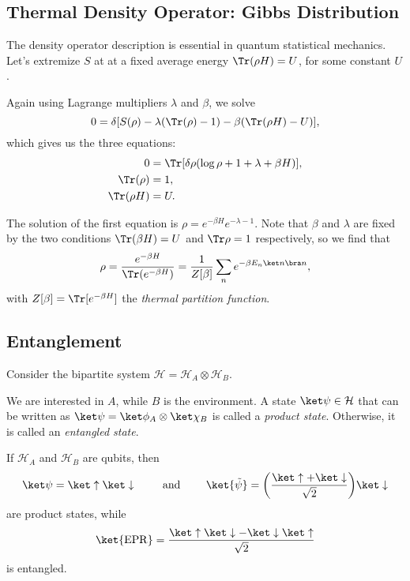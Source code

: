 \documentclass[12pt]{article}
\begin{document}
\subsection{Thermal Density Operator: Gibbs Distribution}
\label{sub:gibbs_dist}

The density operator description is essential in quantum statistical mechanics. Let's extremize $S$ at at a fixed average energy $\Tr(\rho H) = U$, for some constant $U$.

Again using Lagrange multipliers $\lambda$ and $\beta$, we solve
\[
	0 = \delta[S(\rho) - \lambda(\Tr(\rho) - 1) - \beta(\Tr(\rho H) - U)],
\]
which gives us the three equations:
\begin{align*}
	0 &= \Tr[ \delta \rho(\log \rho + 1 + \lambda + \beta H)], \\
	\Tr(\rho) &= 1,\\
	\Tr(\rho H) &= U.
\end{align*}


The solution of the first equation is $\rho = e^{-\beta H} e^{-\lambda - 1}$. Note that $\beta$ and $\lambda$ are fixed by the two conditions $\Tr(\beta H) = U$ and $\Tr \rho = 1$ respectively, so we find that
\[
	\rho = \frac{e^{-\beta H}}{\Tr(e^{-\beta H})} = \frac{1}{Z[\beta]} \sum_n e^{-\beta E_n \ket n \bra n},
\]
with $Z[\beta] = \Tr[e^{-\beta H}]$ the \emph{thermal partition function}.

\subsection{Entanglement}
\label{sub:entanglement}

Consider the bipartite system $\mathcal{H} = \mathcal{H}_A \otimes \mathcal{H}_B$.

We are interested in $A$, while $B$ is the environment. A state $\ket \psi \in \mathcal{H}$ that can be written as $\ket \psi = \ket \phi_A \otimes \ket \chi_B$ is called a \emph{product state}. Otherwise, it is called an \emph{entangled state}.

\begin{exbox}
	If $\mathcal{H}_A$ and $\mathcal{H}_B$ are qubits, then
	\[
		\ket \psi = \ket \uparrow \ket \downarrow \qquad \text{ and } \qquad \ket{\tilde \psi} = \biggl( \frac{\ket \uparrow + \ket \downarrow}{\sqrt 2} \biggr) \ket \downarrow
	\]
	are product states, while
	\[
		\ket{\mathrm{EPR}} = \frac{\ket \uparrow \ket \downarrow - \ket \downarrow \ket \uparrow}{\sqrt 2}
	\]
	is entangled.
\end{exbox}
\end{document}

